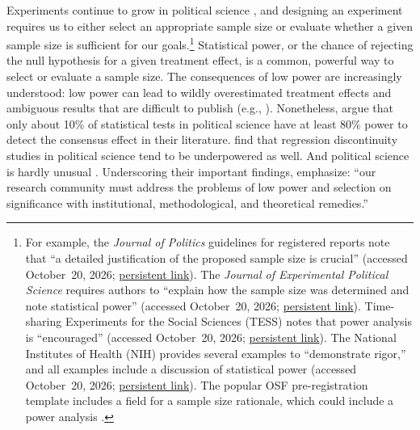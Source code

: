 \documentclass[12pt]{article}
\begin{document}
Experiments continue to grow in political science \citep{Druckman2021}, and designing an experiment requires us to either select an appropriate sample size or evaluate whether a given sample size is sufficient for our goals.\footnote{
  For example, the \emph{Journal of Politics} guidelines for registered reports note that ``a detailed justification of the proposed sample size is crucial'' (accessed October~20, 2026; \href{https://web.archive.org/web/20250702024222/https://www.journals.uchicago.edu/journals/jop/registered-report-guidelines}{persistent link}).
  The \emph{Journal of Experimental Political Science} requires authors to ``explain how the sample size was determined and note statistical power'' (accessed October~20, 2026; \href{https://web.archive.org/web/20261020192159/https://www.cambridge.org/core/journals/journal-of-experimental-political-science/information/author-instructions/preparing-your-materials}{persistent link}).
  Time-sharing Experiments for the Social Sciences (TESS) notes that power analysis is ``encouraged'' (accessed October~20, 2026; \href{https://web.archive.org/web/20261020192157/https://www.tessexperiments.org/info/howtosubmit}{persistent link}).
  The National Institutes of Health (NIH) provides several examples to ``demonstrate rigor,'' and all examples include a discussion of statistical power (accessed October~20, 2026; \href{https://web.archive.org/web/20261020192244/https://grants.nih.gov/policy-and-compliance/policy-topics/reproducibility/resources}{persistent link}).
  The popular OSF pre-registration template includes a field for a sample size rationale, which could include a power analysis \citep{Bowman2020}.}
Statistical power, or the chance of rejecting the null hypothesis for a given treatment effect, is a common, powerful way to select or evaluate a sample size.
The consequences of low power are increasingly understood: low power can lead to wildly overestimated treatment effects \citep{Gelman2014} and ambiguous results that are difficult to publish (e.g., \citealt{Alrababah2023}).
Nonetheless, \citet{ArelBundock2022} argue that only about 10\% of statistical tests in political science have at least 80\% power to detect the consensus effect in their literature.
\citet{Stommes2023} find that regression discontinuity studies in political science tend to be underpowered as well.
And political science is hardly unusual \citep{Cohen1962, Button2013, Ioannidis2017, Stanley2018, Yang2023}.
Underscoring their important findings, \citet[44--45]{ArelBundock2022} emphasize: ``our research community must address the problems of low power and selection on significance with institutional, methodological, and theoretical remedies.''
\end{document}

